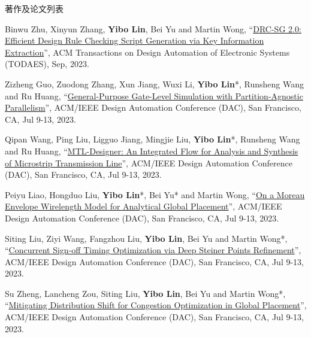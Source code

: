 \begin{rSection}{著作及论文列表}
\begin{description}[font=\normalfont, rightmargin=2em]
{}
            

\item[{[J123]}]{
        Binwu Zhu, Xinyun Zhang, \textbf{Yibo Lin}, Bei Yu and Martin Wong, 
    ``\href{https://doi.org/10.1145/3594666}{DRC-SG 2.0: Efficient Design Rule Checking Script Generation via Key Information Extraction}'', 
    ACM Transactions on Design Automation of Electronic Systems (TODAES), Sep, 2023.
    
}
            

\item[{[C122]}]{
        Zizheng Guo, Zuodong Zhang, Xun Jiang, Wuxi Li, \textbf{Yibo Lin}*, Runsheng Wang and Ru Huang, 
    ``\href{https://doi.org/10.1109/DAC56929.2023.10247907}{General-Purpose Gate-Level Simulation with Partition-Agnostic Parallelism}'', 
    ACM/IEEE Design Automation Conference (DAC), San Francisco, CA, Jul 9-13, 2023.
    
}
            

\item[{[C121]}]{
        Qipan Wang, Ping Liu, Ligguo Jiang, Mingjie Liu, \textbf{Yibo Lin}*, Runsheng Wang and Ru Huang, 
    ``\href{https://doi.org/10.1109/DAC56929.2023.10247759}{MTL-Designer: An Integrated Flow for Analysis and Synthesis of Microstrip Transmission Line}'', 
    ACM/IEEE Design Automation Conference (DAC), San Francisco, CA, Jul 9-13, 2023.
    
}
            

\item[{[C120]}]{
        Peiyu Liao, Hongduo Liu, \textbf{Yibo Lin}*, Bei Yu* and Martin Wong, 
    ``\href{https://doi.org/10.1109/DAC56929.2023.10247712}{On a Moreau Envelope Wirelength Model for Analytical Global Placement}'', 
    ACM/IEEE Design Automation Conference (DAC), San Francisco, CA, Jul 9-13, 2023.
    
}
            

\item[{[C119]}]{
        Siting Liu, Ziyi Wang, Fangzhou Liu, \textbf{Yibo Lin}, Bei Yu and Martin Wong*, 
    ``\href{https://doi.org/10.1109/DAC56929.2023.10247794}{Concurrent Sign-off Timing Optimization via Deep Steiner Points Refinement}'', 
    ACM/IEEE Design Automation Conference (DAC), San Francisco, CA, Jul 9-13, 2023.
    
}
            

\item[{[C118]}]{
        Su Zheng, Lancheng Zou, Siting Liu, \textbf{Yibo Lin}, Bei Yu and Martin Wong*, 
    ``\href{https://doi.org/10.1109/DAC56929.2023.10247660}{Mitigating Distribution Shift for Congestion Optimization in Global Placement}'', 
    ACM/IEEE Design Automation Conference (DAC), San Francisco, CA, Jul 9-13, 2023.
    
}
\end{description}
\end{rSection}
